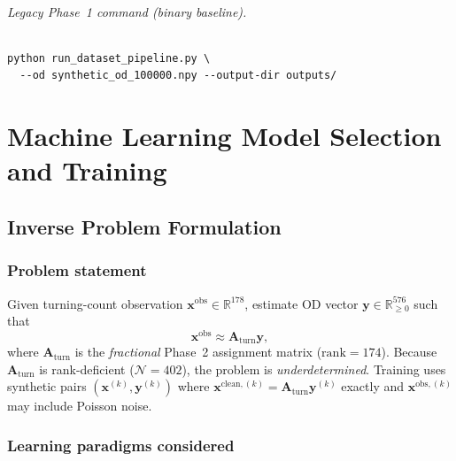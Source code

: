 \documentclass[11pt,a4paper]{report}
\newcommand{\mathbfy}{\mathbf{y}}
\newcommand{\mathbfx}{\mathbf{x}}
\newcommand{\Aturn}{\mathbf{A}_{\mathrm{turn}}}
\begin{document}
\paragraph{Legacy Phase~1 command (binary baseline).}
\begin{verbatim}
python run_dataset_pipeline.py \
  --od synthetic_od_100000.npy --output-dir outputs/
\end{verbatim}


\part{Machine Learning Model Selection and Training}
\label{part:ml}

\chapter{Inverse Problem Formulation}
\label{ch:inverse}

\section{Problem statement}

Given turning-count observation $\mathbfx^{\mathrm{obs}}\in\mathbb{R}^{178}$, estimate OD vector $\mathbfy\in\mathbb{R}^{576}_{\ge 0}$ such that
\begin{equation}
    \mathbfx^{\mathrm{obs}} \approx \Aturn\mathbfy,
\end{equation}
where $\Aturn$ is the \emph{fractional} Phase~2 assignment matrix ($\mathrm{rank}=174$). Because $\Aturn$ is rank-deficient ($\mathcal{N}=402$), the problem is \emph{underdetermined}. Training uses synthetic pairs $(\mathbfx^{(k)},\mathbfy^{(k)})$ where $\mathbfx^{\mathrm{clean},(k)}=\Aturn\mathbfy^{(k)}$ exactly and $\mathbfx^{\mathrm{obs},(k)}$ may include Poisson noise.

\section{Learning paradigms considered}
\end{document}
